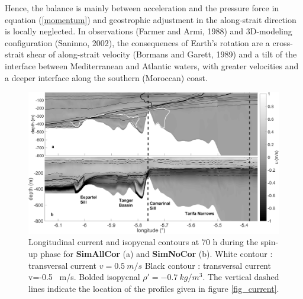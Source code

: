 \documentclass[a4paper,12pt]{article}
\begin{document}
Hence, the balance is mainly between acceleration and the pressure force in equation (\ref{momentum}) and geostrophic adjustment in the along-strait direction is locally neglected. In observations (Farmer and Armi, 1988) and 3D-modeling configuration (Saninno, 2002), the consequences of Earth's rotation are a cross-strait shear of along-strait velocity (Bormans and Garett, 1989) and a tilt of the interface between Mediterranean and Atlantic waters, with greater velocities and a deeper interface along the southern (Moroccan) coast.

%
\begin{figure}[!t]
 \centering
 \includegraphics[width=1\textwidth]{stratif_corio_vs_nocorio.png}
 \caption {Longitudinal current and isopycnal contours at 70 h during the spin-up phase for \textbf{SimAllCor} (a) and \textbf{SimNoCor} (b).
 White contour : transversal current $v = 0.5 \ m/s$  Black contour : transversal current v=-0.5 \ m/s. Bolded isopycnal $\rho' = -0.7 \ kg/m^3$.
 The vertical dashed lines indicate the location of the profiles given in figure \ref{fig_current}.}
  \label{fig2}
\end{figure}

\end{document}
